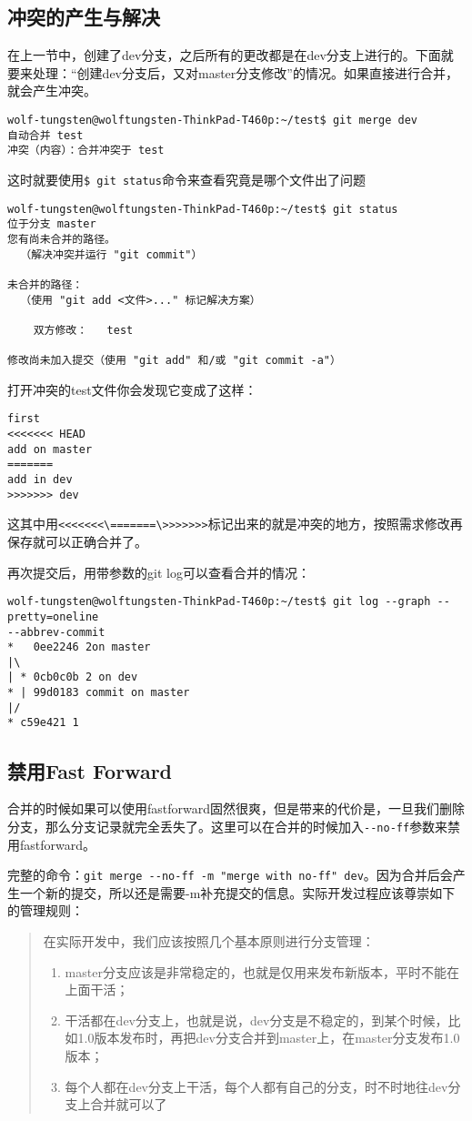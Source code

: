 \documentclass[UTF8]{ctexart}
\newenvironment{myquote}
  {\begin{quote}\kaishu\zihao{-5}}
  {\end{quote}}
\begin{document}
\subsection{冲突的产生与解决}
在上一节中，创建了dev分支，之后所有的更改都是在dev分支上进行的。下面就要来处理：“创建dev分支后，又对master分支修改”的情况。如果直接进行合并，就会产生冲突。
\begin{lstlisting}
wolf-tungsten@wolftungsten-ThinkPad-T460p:~/test$ git merge dev
自动合并 test
冲突（内容）：合并冲突于 test
\end{lstlisting}
这时就要使用\verb!$ git status!命令来查看究竟是哪个文件出了问题

\begin{lstlisting}
wolf-tungsten@wolftungsten-ThinkPad-T460p:~/test$ git status
位于分支 master
您有尚未合并的路径。
  （解决冲突并运行 "git commit"）

未合并的路径：
  （使用 "git add <文件>..." 标记解决方案）

	双方修改：   test

修改尚未加入提交（使用 "git add" 和/或 "git commit -a"）
\end{lstlisting}
打开冲突的test文件你会发现它变成了这样：
\begin{lstlisting}[caption=bash command]
first
<<<<<<< HEAD
add on master
=======
add in dev
>>>>>>> dev
\end{lstlisting}
这其中用\verb!<<<<<<<\=======\>>>>>>>!标记出来的就是冲突的地方，按照需求修改再保存就可以正确合并了。

再次提交后，用带参数的git log可以查看合并的情况：
\begin{lstlisting}[caption=bash command]
wolf-tungsten@wolftungsten-ThinkPad-T460p:~/test$ git log --graph --pretty=oneline 
--abbrev-commit
*   0ee2246 2on master
|\  
| * 0cb0c0b 2 on dev
* | 99d0183 commit on master
|/  
* c59e421 1
\end{lstlisting}

\subsection{禁用Fast Forward}
合并的时候如果可以使用fastforward固然很爽，但是带来的代价是，一旦我们删除分支，那么分支记录就完全丢失了。这里可以在合并的时候加入\verb！--no-ff！参数来禁用fastforward。

完整的命令：\verb!git merge --no-ff -m "merge with no-ff" dev!。因为合并后会产生一个新的提交，所以还是需要-m补充提交的信息。实际开发过程应该尊崇如下的管理规则：
\begin{myquote}
在实际开发中，我们应该按照几个基本原则进行分支管理：
\begin{enumerate}
\item master分支应该是非常稳定的，也就是仅用来发布新版本，平时不能在上面干活；
\item 干活都在dev分支上，也就是说，dev分支是不稳定的，到某个时候，比如1.0版本发布时，再把dev分支合并到master上，在master分支发布1.0版本；
\item 每个人都在dev分支上干活，每个人都有自己的分支，时不时地往dev分支上合并就可以了
\end{enumerate}
\end{myquote}
\end{document}
